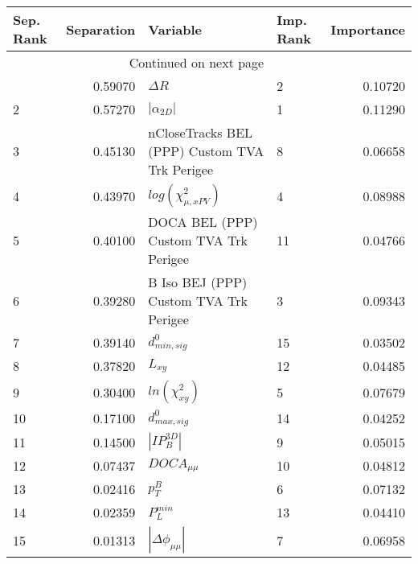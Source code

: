 \usepackage{lscape}

\begin{landscape}
\begin{longtable}{lrllr}
\toprule
Sep. Rank &  Separation &                                       Variable & Imp. Rank &  Importance \\
\midrule
\endhead
\midrule
\multicolumn{3}{r}{{Continued on next page}} \\
\midrule
\endfoot

\bottomrule
\endlastfoot
        1 &     0.59070 &                                     $\Delta R$ &         2 &     0.10720 \\
        2 &     0.57270 &                                $|\alpha_{2D}|$ &         1 &     0.11290 \\
        3 &     0.45130 &  nCloseTracks BEL (PPP) Custom TVA Trk Perigee &         8 &     0.06658 \\
        4 &     0.43970 &                      $log(\chi^{2}_{\mu,xPV})$ &         4 &     0.08988 \\
        5 &     0.40100 &          DOCA BEL (PPP) Custom TVA Trk Perigee &        11 &     0.04766 \\
        6 &     0.39280 &         B Iso BEJ (PPP) Custom TVA Trk Perigee &         3 &     0.09343 \\
        7 &     0.39140 &                               $d^0_{min, sig}$ &        15 &     0.03502 \\
        8 &     0.37820 &                                       $L_{xy}$ &        12 &     0.04485 \\
        9 &     0.30400 &                            $ln(\chi^{2}_{xy})$ &         5 &     0.07679 \\
       10 &     0.17100 &                               $d^0_{max, sig}$ &        14 &     0.04252 \\
       11 &     0.14500 &                                $|IP_{B}^{3D}|$ &         9 &     0.05015 \\
       12 &     0.07437 &                                $DOCA_{\mu\mu}$ &        10 &     0.04812 \\
       13 &     0.02416 &                                      $p^B_{T}$ &         6 &     0.07132 \\
       14 &     0.02359 &                                  $P^{min}_{L}$ &        13 &     0.04410 \\
       15 &     0.01313 &                       $|\Delta \phi_{\mu\mu}|$ &         7 &     0.06958 \\
\end{longtable}

\end{landscape}

